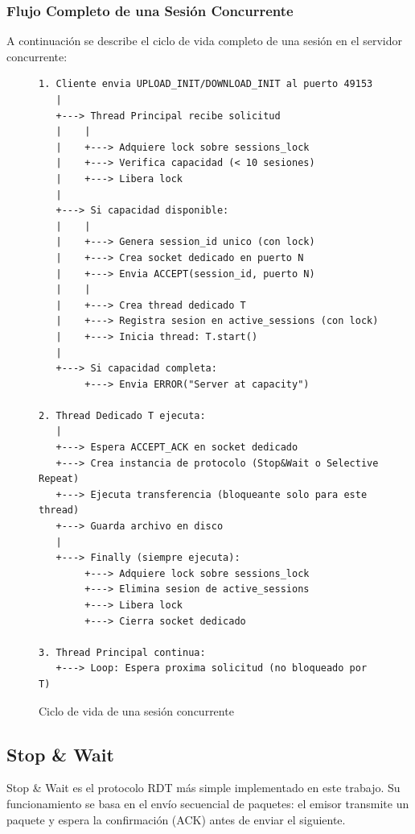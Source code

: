 \subsubsection{Flujo Completo de una Sesión Concurrente}

A continuación se describe el ciclo de vida completo de una sesión en el servidor concurrente:

\begin{figure}[H]
\centering
\small
\begin{minipage}{0.9\textwidth}
\begin{verbatim}
1. Cliente envia UPLOAD_INIT/DOWNLOAD_INIT al puerto 49153
   |
   +---> Thread Principal recibe solicitud
   |    |
   |    +---> Adquiere lock sobre sessions_lock
   |    +---> Verifica capacidad (< 10 sesiones)
   |    +---> Libera lock
   |
   +---> Si capacidad disponible:
   |    |
   |    +---> Genera session_id unico (con lock)
   |    +---> Crea socket dedicado en puerto N
   |    +---> Envia ACCEPT(session_id, puerto N)
   |    |
   |    +---> Crea thread dedicado T
   |    +---> Registra sesion en active_sessions (con lock)
   |    +---> Inicia thread: T.start()
   |
   +---> Si capacidad completa:
        +---> Envia ERROR("Server at capacity")

2. Thread Dedicado T ejecuta:
   |
   +---> Espera ACCEPT_ACK en socket dedicado
   +---> Crea instancia de protocolo (Stop&Wait o Selective Repeat)
   +---> Ejecuta transferencia (bloqueante solo para este thread)
   +---> Guarda archivo en disco
   |
   +---> Finally (siempre ejecuta):
        +---> Adquiere lock sobre sessions_lock
        +---> Elimina sesion de active_sessions
        +---> Libera lock
        +---> Cierra socket dedicado

3. Thread Principal continua:
   +---> Loop: Espera proxima solicitud (no bloqueado por T)
\end{verbatim}
\end{minipage}
\caption{Ciclo de vida de una sesión concurrente}
\end{figure}

\subsection{Stop \& Wait}

Stop \& Wait es el protocolo RDT más simple implementado en este trabajo. Su funcionamiento se basa en el envío secuencial de paquetes: el emisor transmite un paquete y espera la confirmación (ACK) antes de enviar el siguiente.

